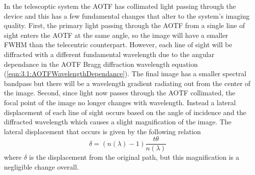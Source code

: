 \documentclass[12pt]{article}
\begin{document}

In the telescoptic system the AOTF has collimated light passing through the device and this has a few fundamental changes that alter to the system's imaging quality. First, the primary light passing through the AOTF from a single line of sight enters the AOTF at the same angle, so the image will have a smaller FWHM than the telecentric counterpart. However, each line of sight will be diffracted with a different fundamental wavelength due to the angular dependance in the AOTF Bragg diffraction wavelength equation (\autoref{eqn:3.1:AOTFWavelengthDependance}). The final image has a smaller spectral bandpass but there will be a wavelength gradient radiating out from the center of the image. Second, since light now passes through the AOTF collimated, the focal point of the image no longer changes with wavelength. Instead a lateral displacement of each line of sight occurs based on the angle of incidence and the diffracted wavelength which causes a slight magnification of the image. The lateral displacement that occurs is given by the following relation
\begin{equation}
    \delta = (n(\lambda)-1)\frac{t\theta}{n(\lambda)}
    \label{eqn:3.2:planeParallelDiplacement}
\end{equation}
where $\delta$ is the displacement from the original path, but this magnification is a negligible change overall.

\end{document}

